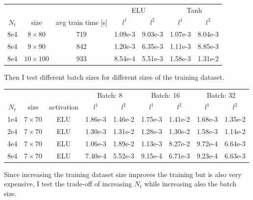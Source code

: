 \documentclass[11pt]{article}
\begin{document}
\begin{center}
\begin{tabular}{ |c|c|c|c|c|c|c| } 
 &&&\multicolumn{2}{c|}{ELU} &\multicolumn{2}{c|}{Tanh}\\
 $N_t$ & size & avg train time [s] & $l^1$ & $l^2$ & $l^1$ & $l^2$\\ 
 \hline
 8e4&$8 \times 80$  &719& 1.09e-3 & 9.03e-3 & 1.07e-3 & 8.04e-3 \\
 8e4&$9 \times 90$  &842& 1.20e-3 & 6.35e-3 & 1.11e-3 & 8.85e-3 \\
 8e4&$10 \times 100$ &933& 8.54e-4 & 5.51e-3 & 1.58e-3 & 1.31e-2 \\
\end{tabular}
\end{center}

Then I test different batch sizes for different sizes of the training dataset.
\begin{center}
\begin{tabular}{ |c|c|c|c|c|c|c|c|c| } 
 &&&\multicolumn{2}{c|}{Batch: 8} &\multicolumn{2}{c|}{Batch: 16} &\multicolumn{2}{c|}{Batch: 32}\\
 $N_t$ & size & activation & $l^1$ & $l^2$ & $l^1$ & $l^2$ & $l^1$ & $l^2$ \\ 
 \hline
 1e4&$7 \times 70$ & ELU & 1.86e-3 & 1.46e-2 & 1.75e-3 & 1.41e-2 & 1.68e-3 & 1.35e-2\\
 2e4&$7 \times 70$ & ELU & 1.30e-3 & 1.31e-2 & 1.28e-3 & 1.30e-2 & 1.58e-3 & 1.14e-2\\
 4e4&$7 \times 70$ & ELU & 1.06e-3 & 1.89e-2 & 1.13e-3 & 8.27e-2 & 9.72e-4 & 6.64e-3\\
 8e4&$7 \times 70$ & ELU & 7.40e-4 & 5.52e-3 & 9.15e-4 & 6.71e-3 & 9.23e-4 & 6.63e-3\\
\end{tabular}
\end{center}

Since increasing the training dataset size improves the training but is also very expensive, I test the trade-off of increasing $N_t$ while increasing also the batch size.
\end{document}
